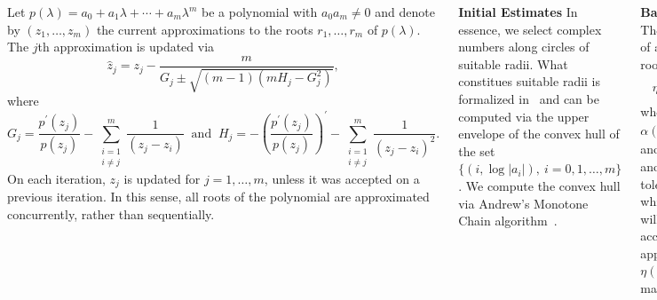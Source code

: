 \documentclass[20 pt, a0paper, portrait]{tikzposter}
\begin{document}
\begin{columns}
	{
		Let $p(\lambda)=a_{0}+a_{1}\lambda+\cdots+a_{m}\lambda^{m}$ be a polynomial with $a_{0}a_{m}\neq 0$ and denote by $(z_{1},\ldots,z_{m})$ the current approximations to the roots $r_{1},\ldots,r_{m}$ of $p(\lambda)$. The $j$th approximation is updated via
		\begin{equation}
		\hat{z}_{j}=z_{j}-\frac{m}{G_{j}\pm\sqrt{(m-1)(mH_{j}-G_{j}^{2})}},
		\end{equation}
		where 
		\begin{equation}
		G_{j}=\frac{p^{'}(z_{j})}{p(z_{j})}-\sum_{\substack{i=1\\i\neq j}}^{m}\frac{1}{(z_{j}-z_{i})}~\text{ and }~H_{j}=-\left(\frac{p^{'}(z_{j})}{p(z_{j})}\right)^{'}-\sum_{\substack{i=1\\i\neq j}}^{m}\frac{1}{(z_{j}-z_{i})^{2}}.
		\end{equation}
		On each iteration, $z_{j}$ is updated for $j=1,\ldots,m$, unless it was accepted on a previous iteration. In this sense, all roots of the polynomial are approximated concurrently, rather than sequentially.
		
	\textbf{Initial Estimates} In essence, we select complex numbers along circles of suitable radii. What constitues suitable radii is formalized in~\cite{Bini1996} and can be computed via the upper envelope of the convex hull of the set $\{(i,\log|a_{i}|),~i=0,1,\ldots,m\}$. We compute the convex hull via Andrew's Monotone Chain algorithm~\cite{Andrew1979}.
	
	\textbf{Backward Error} The backward error of an approximate root $\xi$ is given by
	\begin{equation}
	\eta(\xi)=\frac{|p(\xi)|}{\alpha(\xi)},
	\end{equation}
	where $\alpha(\xi) = \sum_{i=0}^{m}|e_{i}||\xi|^{i}$ and $e_{i}$ are arbitrary and represent tolerances against which perturbations will be measured. We accept a root approximation $\xi$ if $\eta(\xi)<\mu$, where $\mu$ is machine precision. 
	
	\textbf{Condition} The condition of a nonzero approximate root $\xi$ is given by
	\begin{equation}
	\kappa(\xi)=\frac{\alpha(\xi)}{|\xi||p^{'}(\xi)|}.
	\end{equation}
	If the root approximation $\xi$ is accepted, then we also return its condition. Thus, we are able to give the upper bound $\eta(\xi)\cdot\kappa(\xi)$ on the forward error in the root approximation $\xi$. 
	}
	

\end{columns}
\end{document}
